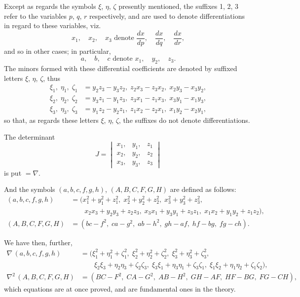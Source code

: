 \documentclass[11pt,a4paper]{book}
\begin{document}
Except as regards the symbols $\xi$, $\eta$, $\zeta$ presently mentioned, the suffixes 1, 2, 3 refer to the variables $p$, $q$, $r$ respectively, and are used to denote differentiations in regard to these variables, viz.
\[
x_1, \quad x_2, \quad x_3 \text{ denote } \frac{dx}{dp}, \quad \frac{dx}{dq}, \quad \frac{dx}{dr},
\]
and so in other cases; in particular,
\[
a, \quad b, \quad c \text{ denote } x_1, \quad y_2, \quad z_3.
\]
The minors formed with these differential coefficients are denoted by suffixed letters $\xi$, $\eta$, $\zeta$, thus
\[
\begin{aligned}
\xi_1, \; \eta_1, \; \zeta_1 &= y_2 z_3 - y_3 z_2, \; z_2 x_3 - z_3 x_2, \; x_2 y_3 - x_3 y_2, \\
\xi_2, \; \eta_2, \; \zeta_2 &= y_3 z_1 - y_1 z_3, \; z_3 x_1 - z_1 x_3, \; x_3 y_1 - x_1 y_3, \\
\xi_3, \; \eta_3, \; \zeta_3 &= y_1 z_2 - y_2 z_1, \; z_1 x_2 - z_2 x_1, \; x_1 y_2 - x_2 y_1,
\end{aligned}
\]
so that, as regards these letters $\xi$, $\eta$, $\zeta$, the suffixes do not denote differentiations.

The determinant
\[
J = \begin{vmatrix}
x_1, & y_1, & z_1 \\
x_2, & y_2, & z_2 \\
x_3, & y_3, & z_3
\end{vmatrix}
\]
is put $= \nabla$.

And the symbols $(a, b, c, f, g, h)$, $(A, B, C, F, G, H)$ are defined as follows:
\[
\begin{aligned}
(a, b, c, f, g, h) &= (x_1^2 + y_1^2 + z_1^2, \; x_2^2 + y_2^2 + z_2^2, \; x_3^2 + y_3^2 + z_3^2, \\
&\qquad x_2 x_3 + y_2 y_3 + z_2 z_3, \; x_3 x_1 + y_3 y_1 + z_3 z_1, \; x_1 x_2 + y_1 y_2 + z_1 z_2), \\
(A, B, C, F, G, H) &= (bc - f^2, \; ca - g^2, \; ab - h^2, \; gh - af, \; hf - bg, \; fg - ch).
\end{aligned}
\]

We have then, further,
\[
\begin{aligned}
\nabla \, (a, b, c, f, g, h) &= (\xi_1^2 + \eta_1^2 + \zeta_1^2, \; \xi_2^2 + \eta_2^2 + \zeta_2^2, \; \xi_3^2 + \eta_3^2 + \zeta_3^2, \\
&\qquad \xi_2 \xi_3 + \eta_2 \eta_3 + \zeta_2 \zeta_3, \; \xi_3 \xi_1 + \eta_3 \eta_1 + \zeta_3 \zeta_1, \; \xi_1 \xi_2 + \eta_1 \eta_2 + \zeta_1 \zeta_2), \\
\nabla^2 \, (A, B, C, F, G, H) &= (BC - F^2, \; CA - G^2, \; AB - H^2, \; GH - AF, \; HF - BG, \; FG - CH),
\end{aligned}
\]
which equations are at once proved, and are fundamental ones in the theory.
\end{document}
